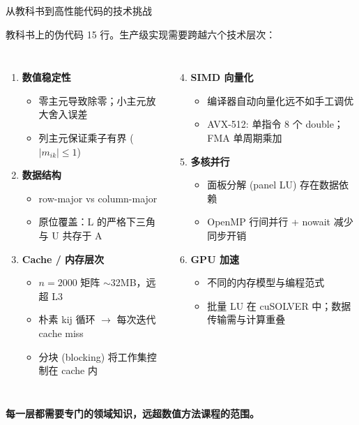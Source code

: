 \documentclass[12pt,aspectratio=169]{beamer}
\begin{document}
\begin{frame}[shrink]{从教科书到高性能代码的技术挑战}

教科书上的伪代码 15 行。生产级实现需要跨越六个技术层次：

\vspace{4pt}
\begin{columns}[T]
\begin{enumerate}
  \item \textbf{数值稳定性}
  \begin{itemize}
    \item 零主元导致除零；小主元放大舍入误差
    \item 列主元保证乘子有界 ($|m_{ik}|\le 1$)
  \end{itemize}
  \item \textbf{数据结构}
  \begin{itemize}
    \item row-major vs column-major
    \item 原位覆盖：L 的严格下三角与 U 共存于 A
  \end{itemize}
  \item \textbf{Cache / 内存层次}
  \begin{itemize}
    \item $n=2000$ 矩阵 $\sim$32MB，远超 L3
    \item 朴素 kij 循环 $\to$ 每次迭代 cache miss
    \item 分块 (blocking) 将工作集控制在 cache 内
  \end{itemize}
\end{enumerate}

\begin{enumerate}
  \setcounter{enumi}{3}
  \item \textbf{SIMD 向量化}
  \begin{itemize}
    \item 编译器自动向量化远不如手工调优
    \item AVX-512: 单指令 8 个 double；FMA 单周期乘加
  \end{itemize}
  \item \textbf{多核并行}
  \begin{itemize}
    \item 面板分解 (panel LU) 存在数据依赖
    \item OpenMP 行间并行 + nowait 减少同步开销
  \end{itemize}
  \item \textbf{GPU 加速}
  \begin{itemize}
    \item 不同的内存模型与编程范式
    \item 批量 LU 在 cuSOLVER 中；数据传输需与计算重叠
  \end{itemize}
\end{enumerate}
\end{columns}

\vspace{4pt}
\begin{center}
\textbf{每一层都需要专门的领域知识，远超数值方法课程的范围。}
\end{center}
\end{frame}
\end{document}
